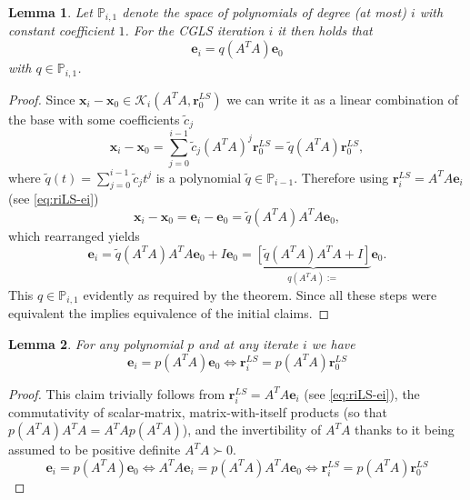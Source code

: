 \documentclass{article}
\newtheorem{lemma}{Lemma}
\begin{document}
	\begin{lemma}\label{lemma:poly-ei}
		Let $\mathbb{P}_{i,1}$ denote the space of polynomials of degree (at most) $i$ with constant coefficient $1$. For the CGLS iteration $i$ it then holds that
		$$\mathbf{e}_i=q(A^TA)\mathbf{e}_0$$
		with $q\in\mathbb{P}_{i,1}$. 
	\end{lemma}
	\begin{proof}
		Since $\textbf{x}_i - \textbf{x}_0 \in \mathcal{K}_i\left(A^T A, \textbf{r}_0^{LS} \right)$ we can write it as a linear combination of the base with some coefficients $\tilde{c}_j$
		\begin{equation}
			\textbf{x}_i - \textbf{x}_0 = \sum_{j=0}^{i-1} \tilde{c}_j \left(A^T A \right)^j \textbf{r}_0^{LS} = \tilde{q}\left(A^T A \right) \textbf{r}_0^{LS},
		\end{equation}
		where $\tilde{q}(t) = \sum_{j=0}^{i-1} \tilde{c}_j t^j$ is a polynomial $\tilde{q} \in \mathbb{P}_{i-1}$. Therefore using $\textbf{r}_i^{LS} = A^T A \textbf{e}_i$ (see \autoref{eq:riLS-ei})
		\begin{equation}
			\textbf{x}_i - \textbf{x}_0 = \textbf{e}_i - \textbf{e}_0 = \tilde{q}\left(A^T A \right) A^T A \textbf{e}_0,
		\end{equation}
		which rearranged yields
		\begin{equation}
			\textbf{e}_i =  \tilde{q}\left(A^T A \right) A^T A \textbf{e}_0 + I \textbf{e}_0= \underbrace{\left[\tilde{q}\left(A^T A \right) A^T A + I\right]}_{q\left(A^T A\right) := } \textbf{e}_0.
		\end{equation}
		This $q\in\mathbb{P}_{i,1}$ evidently as required by the theorem. Since all these steps were equivalent the implies equivalence of the initial claims.
	\end{proof}
	
	\begin{lemma}\label{lemma:poly-riLS}
		For any polynomial $p$ and at any iterate $i$ we have
		$$\mathbf{e}_i=p(A^TA)\mathbf{e}_0 \iff \mathbf{r}_i^{LS}=p(A^TA)\mathbf{r}_0^{LS}$$
	\end{lemma}
	\begin{proof}
		This claim trivially follows from $\textbf{r}_i^{LS} = A^T A \textbf{e}_i$ (see \autoref{eq:riLS-ei}), the commutativity of scalar-matrix, matrix-with-itself products (so that $p(A^TA)A^TA = A^T A p(A^TA)$), and the invertibility of $A^T A$ thanks to it being assumed to be positive definite $A^T A \succ 0$.
		\begin{equation}
			\mathbf{e}_i=p(A^TA)\mathbf{e}_0 \iff
			A^TA\mathbf{e}_i=p(A^TA)A^TA\mathbf{e}_0 \iff
			 \mathbf{r}_i^{LS}=p(A^TA)\mathbf{r}_0^{LS} 
		\end{equation}
	\end{proof}
	
\end{document}
